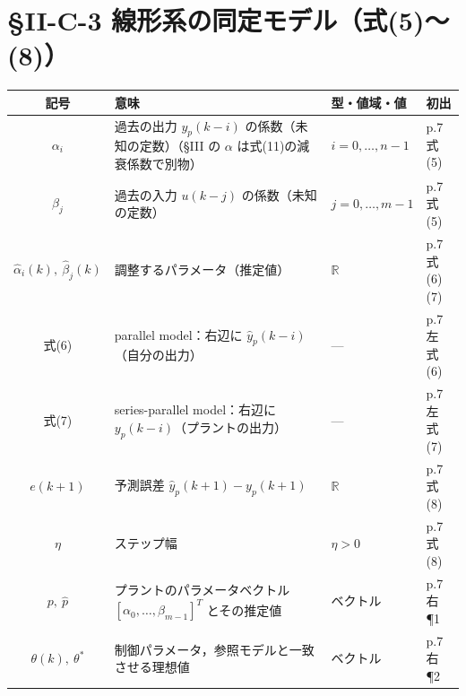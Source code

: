 \documentclass[a4paper,10pt]{ltjsarticle}
\newcommand{\note}[1]{\textcolor{red!70!black}{#1}}
\newenvironment{symtab}{%
  \par\noindent\begin{tabular}{SMTP}
  \toprule
  記号 & 意味 & 型・値域・値 & 初出 \\
  \midrule
}{\bottomrule\end{tabular}\par\medskip}
\begin{document}
\section{§II-C-3 線形系の同定モデル（式(5)〜(8)）}
\begin{symtab}
$\alpha_i$ & 過去の出力 $y_p(k-i)$ の係数（未知の定数）\note{（§III の $\alpha$ は式(11)の減衰係数で別物）} & $i=0,\dots,n-1$ & p.7 式(5) \\
$\beta_j$ & 過去の入力 $u(k-j)$ の係数（未知の定数） & $j=0,\dots,m-1$ & p.7 式(5) \\
$\hat\alpha_i(k),\ \hat\beta_j(k)$ & 調整するパラメータ（推定値） & $\mathbb{R}$ & p.7 式(6)(7) \\
式(6) & parallel model：右辺に $\hat y_p(k-i)$（自分の出力） & --- & p.7 左 式(6) \\
式(7) & series-parallel model：右辺に $y_p(k-i)$（プラントの出力） & --- & p.7 左 式(7) \\
$e(k+1)$ & 予測誤差 $\hat y_p(k+1)-y_p(k+1)$ & $\mathbb{R}$ & p.7 式(8) \\
$\eta$ & ステップ幅 & $\eta>0$ & p.7 式(8) \\
$p,\ \hat p$ & プラントのパラメータベクトル $[\alpha_0,\dots,\beta_{m-1}]^T$ とその推定値 & ベクトル & p.7 右 ¶1 \\
$\theta(k),\ \theta^*$ & 制御パラメータ，参照モデルと一致させる理想値 & ベクトル & p.7 右 ¶2 \\
\end{symtab}

\end{document}
